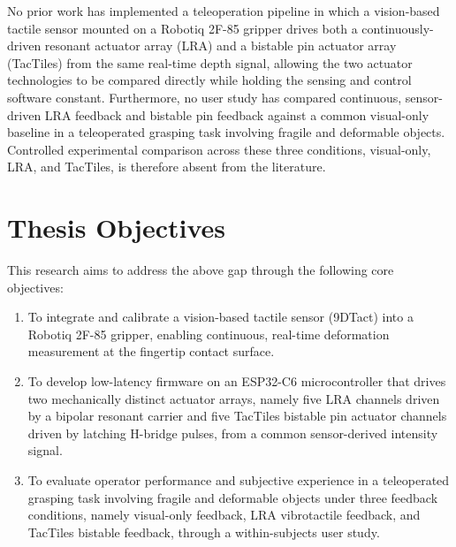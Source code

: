 \documentclass[12pt, a4paper]{report}
\begin{document}
No prior work has implemented a teleoperation pipeline in which a vision-based tactile sensor mounted on a Robotiq 2F-85 gripper drives both a continuously-driven resonant actuator array (LRA) and a bistable pin actuator array (TacTiles) from the same real-time depth signal, allowing the two actuator technologies to be compared directly while holding the sensing and control software constant. Furthermore, no user study has compared continuous, sensor-driven LRA feedback and bistable pin feedback against a common visual-only baseline in a teleoperated grasping task involving fragile and deformable objects. Controlled experimental comparison across these three conditions, visual-only, LRA, and TacTiles, is therefore absent from the literature.

\section{Thesis Objectives}
This research aims to address the above gap through the following core objectives:
\begin{enumerate}
    \item To integrate and calibrate a vision-based tactile sensor (9DTact) into a Robotiq 2F-85 gripper, enabling continuous, real-time deformation measurement at the fingertip contact surface.
    \item To develop low-latency firmware on an ESP32-C6 microcontroller that drives two mechanically distinct actuator arrays, namely five LRA channels driven by a bipolar resonant carrier and five TacTiles bistable pin actuator channels driven by latching H-bridge pulses, from a common sensor-derived intensity signal.
    \item To evaluate operator performance and subjective experience in a teleoperated grasping task involving fragile and deformable objects under three feedback conditions, namely visual-only feedback, LRA vibrotactile feedback, and TacTiles bistable feedback, through a within-subjects user study.
\end{enumerate}
\end{document}
